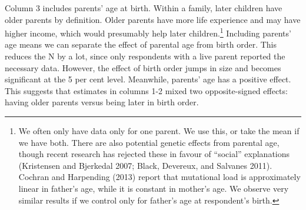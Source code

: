 \documentclass[
]{article}
\begin{document}
Column 3 includes parents' age at birth. Within a family, later children
have older parents by definition. Older parents have more life
experience and may have higher income, which would presumably help later
children.\footnote{We often only have data only for one parent. We use this, or take the mean
  if we have both. There are also potential
  genetic effects from parental age, though recent research has rejected these
  in favour of ``social'' explanations (Kristensen and Bjerkedal 2007; Black, Devereux, and Salvanes 2011).
  Cochran and Harpending (2013) report that mutational load is approximately
  linear in father's age, while it is constant in mother's age. We
  observe very similar results if we control only for father's age at
  respondent's birth.} Including parents' age means we can separate the effect
of parental age from birth order. This reduces the N by a lot, since
only respondents with a live parent reported the necessary data. However,
the effect of birth order jumps in size and becomes significant at the 5 per
cent level. Meanwhile, parents' age has a
positive effect. This suggests that estimates in columns 1-2 mixed two
opposite-signed effects: having older parents versus being later in
birth order.

 
  \providecommand{\huxb}[2]{\arrayrulecolor[RGB]{#1}\global\arrayrulewidth=#2pt}
  \providecommand{\huxvb}[2]{\color[RGB]{#1}\vrule width #2pt}
  \providecommand{\huxtpad}[1]{\rule{0pt}{#1}}
  \providecommand{\huxbpad}[1]{\rule[-#1]{0pt}{#1}}
\end{document}

